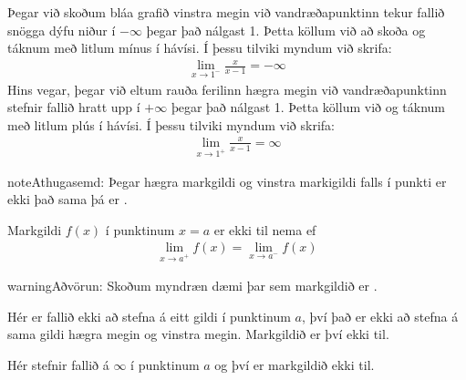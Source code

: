 \documentclass[a4paper,10pt,icelandic]{sphinxmanual}
\begin{document}
Þegar við skoðum bláa grafið vinstra megin við vandræðapunktinn tekur fallið snögga dýfu niður í \(-\infty\) þegar það nálgast 1.
Þetta köllum við að skoða  og táknum með litlum mínus í hávísi.
Í þessu tilviki myndum við skrifa:
\begin{equation*}
\begin{split}\lim_{x \to 1^{-}} \frac{x}{x-1} = -\infty\end{split}
\end{equation*}
Hins vegar, þegar við eltum rauða ferilinn hægra megin við vandræðapunktinn stefnir fallið hratt upp í \(+\infty\) þegar það nálgast 1.
Þetta köllum við  og táknum með litlum plús í hávísi.
Í þessu tilviki myndum við skrifa:
\begin{equation*}
\begin{split}\lim_{x \to 1^{+}} \frac{x}{x-1} = \infty\end{split}
\end{equation*}
\begin{sphinxadmonition}{note}{Athugasemd:}
Þegar hægra markgildi og vinstra markigildi falls í punkti er ekki það sama þá er .

Markgildi \(f(x)\) í punktinum \(x=a\) er ekki til nema ef
\begin{equation*}
\begin{split}\lim_{x\to a^+} f(x) = \lim_{x\to a^-} f(x)\end{split}
\end{equation*}\end{sphinxadmonition}

\begin{sphinxadmonition}{warning}{Aðvörun:}
Skoðum myndræn dæmi þar sem markgildið er .

\begin{figure}[H]
\centering

\noindent{}
\end{figure}

Hér er fallið ekki að stefna á eitt gildi í punktinum \(a\), því það er ekki að stefna á sama gildi hægra megin og vinstra megin. Markgildið er því ekki til.

\begin{figure}[H]
\centering

\noindent{}
\end{figure}

Hér stefnir fallið á \(\infty\) í punktinum \(a\) og því er markgildið ekki til.
\end{sphinxadmonition}
\end{document}

